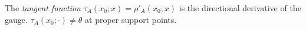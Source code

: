 The \emph{tangent function} $\tau_A(x_0;x)=\rho'_A(x_0;x)$ is the directional derivative of the gauge. $\tau_A(x_0;\cdot)\neq\theta$ at proper support points.
